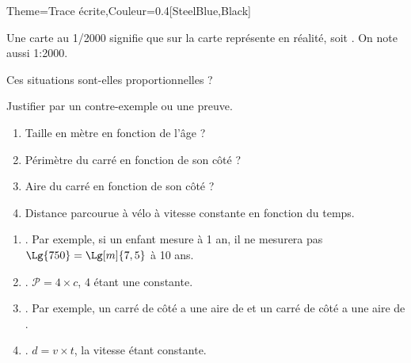 \begin{Maquette}[Cours]{Theme={Trace écrite},Couleur={0.4[SteelBlue,Black]}}
   \begin{exemple*}{}
      Une carte au 1/\num{2000} signifie que  sur la carte représente  en réalité, soit . On note aussi 1:\num{2000}.
       \vspace*{-6mm}
   \end{exemple*}

\end{Maquette}


\begin{Maquette}[Fiche,CorrigeFin,Colonnes=2]{}

   \begin{multicols}{2}

      \begin{exercice} %
         Ces situations sont-elles proportionnelles ? \par
         Justifier par un contre-exemple ou une preuve.
         \begin{enumerate}
            \item Taille en mètre en fonction de l'âge ?
            \item Périmètre du carré en fonction de son côté ?
            \item Aire du carré en fonction de son côté ?
            \item Distance parcourue à vélo à vitesse constante en fonction du temps.
         \end{enumerate}
      \end{exercice}
      
      \begin{Solution}
         \begin{enumerate}
            \item {}. Par exemple, si un enfant mesure  à 1 an, il ne mesurera pas $\Lg{750} =\Lg[m]{7,5}$ à 10 ans.
            \item {}. $\mathcal{P} =4\times c$, 4 étant une constante.
            \item {}. Par exemple, un carré de côté  a une aire de  et un carré de côté  a une aire de .
            \item {}. $d =v\times t$, la vitesse étant constante.
         \end{enumerate}
      \end{Solution}
      

\end{multicols}
\end{Maquette}
